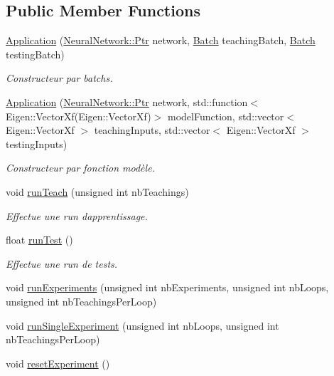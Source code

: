 \subsection*{Public Member Functions}
\begin{DoxyCompactItemize}
\item 
\hyperlink{classApplication_ab46d83da0e069b75ab971725bcf24a54}{Application} (\hyperlink{classNeuralNetwork_a31de381df65f261fd0f38e0559995d1a}{Neural\+Network\+::\+Ptr} network, \hyperlink{classApplication_a9888f02149ca3b8ffa499ee07426cd1d}{Batch} teaching\+Batch, \hyperlink{classApplication_a9888f02149ca3b8ffa499ee07426cd1d}{Batch} testing\+Batch)
\begin{DoxyCompactList}\small\item\em Constructeur par batchs. \end{DoxyCompactList}\item 
\hyperlink{classApplication_a662325bca303994250427110d5d771e7}{Application} (\hyperlink{classNeuralNetwork_a31de381df65f261fd0f38e0559995d1a}{Neural\+Network\+::\+Ptr} network, std\+::function$<$ Eigen\+::\+Vector\+Xf(Eigen\+::\+Vector\+Xf)$>$ model\+Function, std\+::vector$<$ Eigen\+::\+Vector\+Xf $>$ teaching\+Inputs, std\+::vector$<$ Eigen\+::\+Vector\+Xf $>$ testing\+Inputs)
\begin{DoxyCompactList}\small\item\em Constructeur par fonction modèle. \end{DoxyCompactList}\item 
void \hyperlink{classApplication_ae93c9eb1888c7b3bbab68aa5da50ce46}{run\+Teach} (unsigned int nb\+Teachings)
\begin{DoxyCompactList}\small\item\em Effectue une run d\textquotesingle{}apprentissage. \end{DoxyCompactList}\item 
float \hyperlink{classApplication_abd01b94dfbff9ce3ecf9e77f840a81fa}{run\+Test} ()
\begin{DoxyCompactList}\small\item\em Effectue une run de tests. \end{DoxyCompactList}\item 
void \hyperlink{classApplication_ad57005e2c8e096af66eca715a7c6a961}{run\+Experiments} (unsigned int nb\+Experiments, unsigned int nb\+Loops, unsigned int nb\+Teachings\+Per\+Loop)
\item 
void \hyperlink{classApplication_a57dbef541907f1d1436732afec051ac2}{run\+Single\+Experiment} (unsigned int nb\+Loops, unsigned int nb\+Teachings\+Per\+Loop)
\item 
void \hyperlink{classApplication_a88102872db25c2f897ba6d6832ecaedc}{reset\+Experiment} ()
\end{DoxyCompactItemize}

